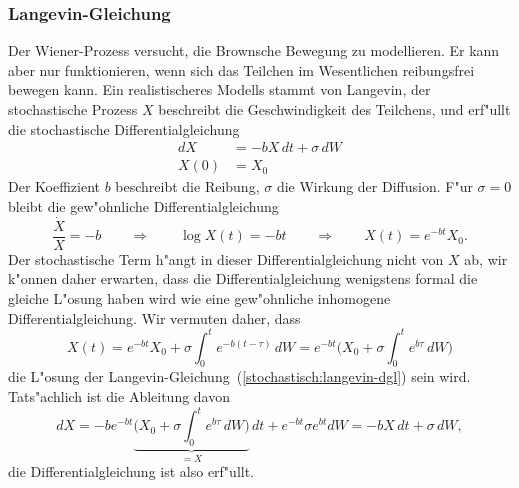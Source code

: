 \subsubsection{Langevin-Gleichung}
Der Wiener-Prozess versucht, die Brownsche Bewegung zu modellieren.
Er kann aber nur funktionieren, wenn sich das Teilchen im Wesentlichen
reibungsfrei bewegen kann.
Ein realistischeres Modells stammt von Langevin, der stochastische 
Prozess $X$ beschreibt die Geschwindigkeit des Teilchens, und erf"ullt
die stochastische Differentialgleichung
\begin{equation}
\begin{aligned}
dX&=-bX\,dt+\sigma\,dW\\
X(0)&=X_0
\end{aligned}
\label{stochastisch:langevin-dgl}
\end{equation}
Der Koeffizient $b$ beschreibt die Reibung, $\sigma$ die Wirkung der
Diffusion.
F"ur $\sigma=0$ bleibt die gew"ohnliche Differentialgleichung
\[
\frac{\dot X}{X}=-b
\qquad\Rightarrow\qquad
\log X(t)=-bt
\qquad\Rightarrow\qquad
X(t)=e^{-bt}X_0.
\]
Der stochastische Term h"angt in dieser Differentialgleichung nicht von $X$
ab, wir k"onnen daher erwarten, dass die Differentialgleichung wenigstens
formal die gleiche L"osung haben wird wie eine gew"ohnliche
inhomogene Differentialgleichung.
Wir vermuten daher, dass
\begin{equation}
X(t)
=
e^{-bt}X_0 + \sigma\int_0^te^{-b(t-\tau)}\,dW
=
e^{-bt}\biggl(X_0 + \sigma\int_0^te^{b\tau}\,dW\biggr)
\label{stochastisch:langevin-lsg}
\end{equation}
die L"osung der Langevin-Gleichung~(\ref{stochastisch:langevin-dgl})
sein wird.
Tats"achlich ist die Ableitung davon
\[
dX
=
-be^{-bt}
\underbrace{\biggl(X_0 + \sigma\int_0^te^{b\tau}\,dW\biggr)}_{\textstyle =X}\,dt
+
e^{-bt}
\sigma e^{bt}dW
=
-bX\,dt +\sigma\,dW,
\]
die Differentialgleichung ist also erf"ullt.

